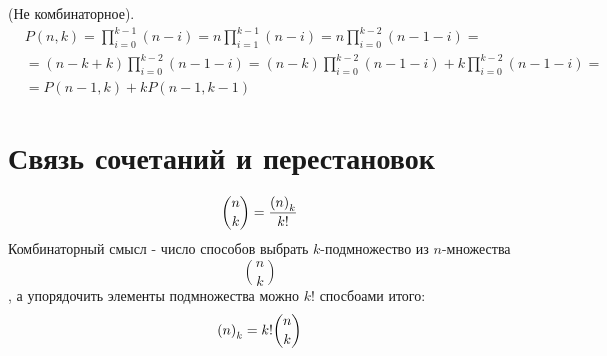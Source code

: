 \begin{Proof} (Не комбинаторное).
\[
	\begin{split}
		& P\left(n,k\right) = \prod_{i=0}^{k-1}\left(n-i\right) = n\prod_{i=1}^{k-1}\left(n-i\right) = n\prod_{i=0}^{k-2}\left(n-1-i\right) = \\
		& = \left(n-k+k\right)\prod_{i=0}^{k-2}\left(n-1-i\right) = \left(n-k\right)\prod_{i=0}^{k-2}\left(n-1-i\right) + k\prod_{i=0}^{k-2}\left(n-1-i\right) = \\
		& = P\left(n-1,k\right) + kP\left(n-1,k-1\right)
	\end{split}
\]
\end{Proof}

\section{Связь сочетаний и перестановок}

\begin{equation}
	\binom{n}{k} = \frac{\left({n}\right)_{k}}{k!}
\end{equation}
Комбинаторный смысл - число способов выбрать $k$-подмножество из $n$-множества $$ \binom{n}{k} $$, а упорядочить элементы подмножества можно $k!$ спосбоами итого:
\[
	\left({n}\right)_{k} = k! \binom{n}{k}
\]
